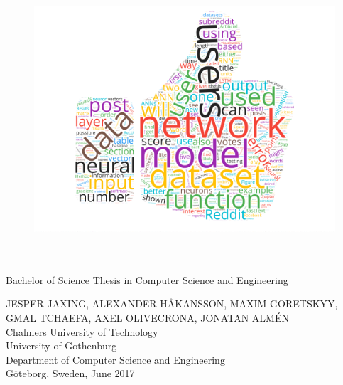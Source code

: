 
\begin{titlepage}
			
\addtolength{\voffset}{2cm}

\begin{figure}[H]
\centering
\vspace{1cm}	%
\includegraphics[width=0.9\linewidth]{figure/front/wordcloud-trans.png}
\end{figure}

\mbox{}
\renewcommand{\familydefault}{\sfdefault} \normalfont %
\begin{flushleft}
\textbf{{\Huge \varthetitle}} 	\\[0.5cm]
{\LARGE \varthesubtitle}\\[0.2cm]
Bachelor of Science Thesis in Computer Science and Engineering \setlength{\parskip}{0.5cm}

{\large JESPER JAXING, ALEXANDER HÅKANSSON, MAXIM GORETSKYY, GMAL TCHAEFA, AXEL OLIVECRONA, JONATAN ALMÉN} \setlength{\parskip}{1.9cm}\\
\vfill
Chalmers University of Technology \\
University of Gothenburg \\
Department of Computer Science and Engineering \\
Göteborg, Sweden, June 2017

\end{flushleft}
\end{titlepage}

